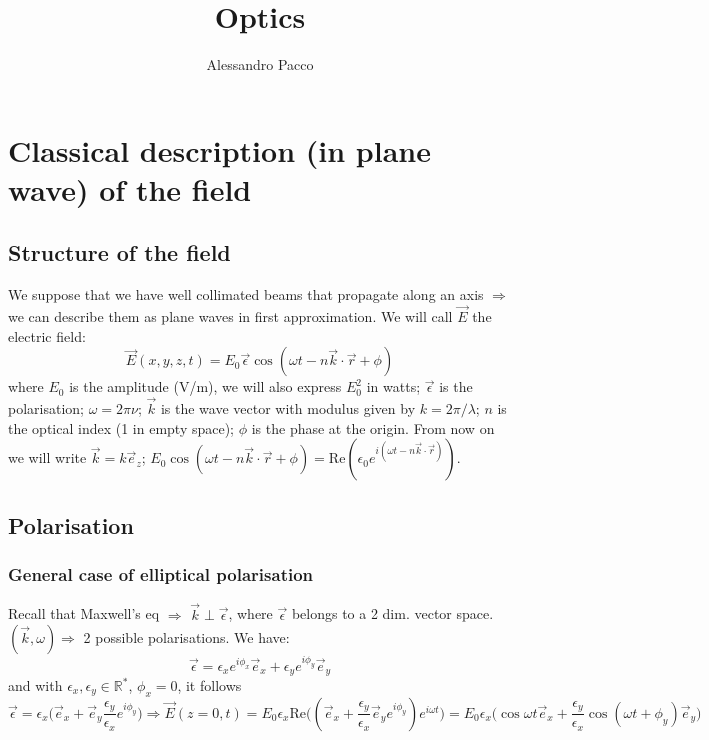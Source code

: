\documentclass[10pt,a4paper]{book}
\author{Alessandro Pacco}
\title{Optics}
\begin{document}
\maketitle


\tableofcontents


\chapter{Classical description (in plane wave) of the field}
\section{Structure of the field}

We suppose that we have well collimated beams that propagate along an axis $\Rightarrow$ we can describe them as plane waves in first approximation. We will call $\vec{E}$ the electric field: 
$$\vec{E}(x,y,z,t)=E_0\vec{\epsilon}\cos(\omega t-n\vec{k}\cdot \vec{r}+\phi)$$
where $E_0$ is the amplitude (V/m), we will also express $E_0^2$ in watts; $\vec{\epsilon}$ is the polarisation; $\omega =2\pi\nu$; $\vec{k}$ is the wave vector with modulus given by $k=2\pi/\lambda$; $n$ is the optical index (1 in empty space); $\phi$ is the phase at the origin.
From now on we will write $\vec{k}=k\vec{e}_z$; $E_0\cos(\omega t-n\vec{k}\cdot \vec{r}+\phi)=\text{Re}(\epsilon_0e^{i(\omega t-n\vec{k}\cdot\vec{r})})$.
\section{Polarisation}
\subsection{General case of elliptical polarisation}
Recall that Maxwell's eq $\Rightarrow$ $\vec{k}\perp \vec{\epsilon}$, where $\vec{\epsilon}$ belongs to a 2 dim. vector space. $(\vec{k},\omega)\Rightarrow$ 2 possible polarisations. We have:
$$\vec{\epsilon}=\epsilon_x e^{i\phi_x}\vec{e}_x+\epsilon_y e^{i\phi_y}\vec{e}_y$$
and with $\epsilon_x,\epsilon_y\in\mathbb{R}^{*}$, $\phi_x=0$, it follows $$\vec{\epsilon}=\epsilon_x\bigg(\vec{e}_x+\vec{e}_y\frac{\epsilon_y}{\epsilon_x} e^{i\phi_y}\bigg)\Rightarrow \vec{E}(z=0,t)=E_0\epsilon_x\text{Re}\bigg((\vec{e}_x+\frac{\epsilon_y}{\epsilon_x}\vec{e}_ye^{i\phi_y})e^{i\omega t}\bigg)=E_0\epsilon_x\bigg(\cos\omega t\vec{e}_x+\frac{\epsilon_y}{\epsilon_x}\cos(\omega t+\phi_y)\vec{e}_y\bigg)$$
\end{document}
